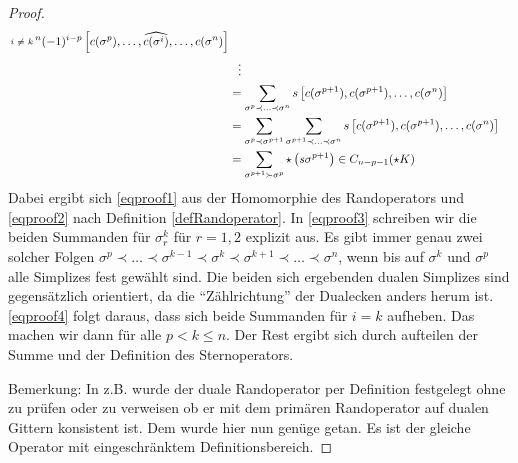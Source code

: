 \begin{proof}
\begin{align}
{\begin{smallmatrix}
                                                  i & \neq & k
                                                \end{smallmatrix}}^{n} (-1)^{i-p} \left[ c(\sigma^{p}),\ldots, \widehat{c(\sigma^{i})},\ldots, c(\sigma^{n})\right] \label{eqproof4}\\
                              &\hphantom{=}\vdots\notag\\
                              &= \sum_{\sigma^{p}\prec\ldots\prec\sigma^{n}} s \left[ c(\sigma^{p+1}), c(\sigma^{p+1}),\ldots, c(\sigma^{n})\right]  \label{eqproof5}\\
                              &= \sum_{\sigma^{p}\prec\sigma^{p+1}}
                                          \sum_{\sigma^{p+1}\prec\ldots\prec\sigma^{n}} s \left[ c(\sigma^{p+1}), c(\sigma^{p+1}),\ldots, c(\sigma^{n})\right]  \label{eqproof5}\\
                              &= \sum_{\sigma^{p+1} \succ \sigma^{p}} \star \left( s \sigma^{p+1} \right) \in C_{n-p-1}(\star K)
    \end{align}
    Dabei ergibt sich \eqref{eqproof1} aus der Homomorphie des Randoperators und \eqref{eqproof2} nach Definition \ref{defRandoperator}.
    In \eqref{eqproof3} schreiben wir die beiden Summanden für \( \sigma^{k}_{r} \) für \( r = 1,2 \) explizit aus. 
    Es gibt immer genau zwei solcher Folgen \( \sigma^{p}\prec\ldots\prec\sigma^{k-1}\prec\sigma^{k}\prec\sigma^{k+1}\prec\ldots\prec\sigma^{n} \),
    wenn bis auf \( \sigma^{k} \) und \( \sigma^{p} \) alle Simplizes fest gewählt sind. 
    Die beiden sich ergebenden dualen Simplizes sind gegensätzlich orientiert, da die "`Zählrichtung"' der Dualecken anders herum ist.
    \eqref{eqproof4} folgt daraus, dass sich beide Summanden für \( i=k \) aufheben. 
    Das machen wir dann für alle \( p < k \le n \).
    Der Rest ergibt sich durch aufteilen der Summe und der Definition des Sternoperators.

    Bemerkung:
    In z.B. \cite{hirani} wurde der duale Randoperator per Definition festgelegt ohne zu prüfen oder zu verweisen 
    ob er mit dem primären Randoperator auf dualen Gittern konsistent ist.
    Dem wurde hier nun genüge getan. Es ist der gleiche Operator mit eingeschränktem Definitionsbereich.
  \end{proof}

